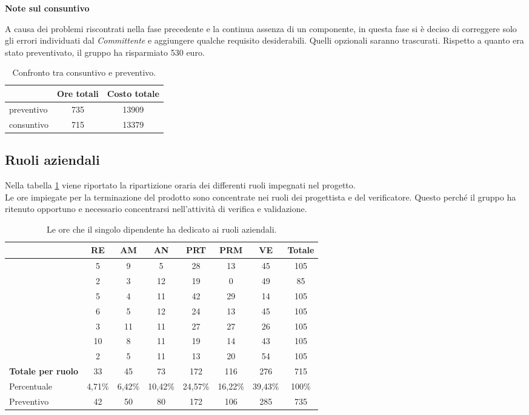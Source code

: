 {{{		\textbf{Note sul consuntivo}{
	A causa dei problemi riscontrati nella fase precedente e la continua assenza di un componente, in questa fase si è deciso di correggere solo gli errori individuati dal \textit{Committente} e aggiungere qualche requisito desiderabili. Quelli opzionali saranno trascurati. 
	Rispetto a quanto era stato preventivato, il gruppo ha risparmiato 530 euro.
		\begin{table}[h!]
		\begin{center}
			\begin{tabular}{l c c}				
				\toprule
					&Ore totali& Costo totale \\ 
				\midrule
				preventivo	&	735	& 13909\\ 
				consuntivo	&	715	& 13379\\
				\bottomrule
			\end{tabular}	
		\caption{Confronto tra consuntivo e preventivo.}
		\end{center}
	\end{table}
	}
	}
	
	\newpage
	\subsection{Ruoli aziendali}{
	Nella tabella \ref{fig: ruoli} viene riportato la ripartizione oraria dei differenti ruoli impegnati nel progetto.\\
	Le ore impiegate per la terminazione del prodotto sono concentrate nei ruoli dei progettista e del verificatore. Questo perché il gruppo ha ritenuto opportuno e necessario concentrarsi nell'attività di verifica e validazione.
	
	\begin{table}[h!]
		\begin{center}
			\begin{tabular}{l c c c c c c c}				
				\toprule
				&	RE& AM& AN& PRT& PRM& VE& Totale \\ 
				\midrule
				\BM	&	5	&	9	&	5	&	28	&	13	&	45	&	105\\ 
				\BA	&	2	&	3	&	12	&	19	&	0	&	49 	&	85\\
				\CD	&	5	&	4	&	11	&	42	&	29	&	14 	&	105\\ 
				\LS	&	6	&	5	&	12	&	24	&	13	&	45  &	105\\
				\PV &	3	&	11	&	11	&	27	&	27	&	26  &	105\\
				\ZF 	&	10	&	8	&	11	&	19	&	14	&	43  &	105\\	
				\ZE &	2	&	5	&	11	&	13	&	20	&	54	&	105\\ \hline
				\textbf{Totale per ruolo}&	 33 &	45 &	73	&	172 &	116 & 276 & 715\\ \hline
				Percentuale	&	4,71\% & 6,42\% & 10,42\% & 24,57\% & 16,22\% &  39,43\% & 100\%\\ 
				Preventivo & 42 & 50 & 80  & 172 & 106 & 285 & 735\\
				\bottomrule
			\end{tabular}	
		\caption{Le ore che il singolo dipendente ha dedicato ai ruoli aziendali.} \label{fig: ruoli}
		\end{center}
	\end{table}
	
}}}
